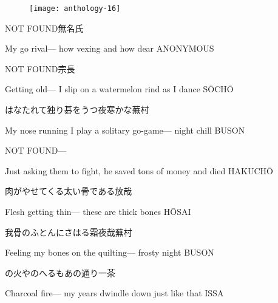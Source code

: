 \begin{figure}
    \texttt{[image: anthology-16]}
\end{figure}

\begin{haiku}
    NOT FOUND\hfill{\FH 無名氏}

    \vin{} My go rival---
    \vin{} \vin{} how vexing
    \vin{} \vin{} \vin{} and how dear \hspace{\fill} ANONYMOUS
\end{haiku}

\begin{haiku}
    NOT FOUND\hfill{\FH 宗長}

    \vin{} Getting old---
    \vin{} \vin{} I slip on a watermelon rind
    \vin{} \vin{} \vin{} as I dance \hspace{\fill} S\={O}CH\={O}
\end{haiku}

\begin{haiku}
    {\FH はなたれて独り碁をうつ夜寒かな}\hfill{\FH 蕪村}

    \vin{} My nose running
    \vin{} \vin{} I play a solitary go-game---
    \vin{} \vin{} \vin{} night chill \hspace{\fill} BUSON
\end{haiku}

\begin{haiku}
   NOT FOUND\hfill{---}

    \vin{} Just asking them to fight,
    \vin{} \vin{} he saved tons of money
    \vin{} \vin{} \vin{} and died \hspace{\fill} HAKUCH\={O}
\end{haiku}

\begin{haiku}
    {\FH 肉がやせてくる太い骨である}\hfill{\FH 放哉}

    \vin{} Flesh getting thin---
    \vin{} \vin{} these are thick bones \hspace{\fill} H\={O}SAI
\end{haiku}

\begin{haiku}
    {\FH 我骨のふとんにさはる霜夜哉}\hfill{\FH 蕪村}

    \vin{} Feeling my bones
    \vin{} \vin{} on the quilting---
    \vin{} \vin{} \vin{} frosty night \hspace{\fill} BUSON
\end{haiku}

\begin{haiku}
    {\FH {}の火やのへるもあの通り}\hfill{\FH 一茶}

    \vin{} Charcoal fire---
    \vin{} \vin{} my years dwindle down
    \vin{} \vin{} \vin{} just like that \hspace{\fill} ISSA
\end{haiku}

